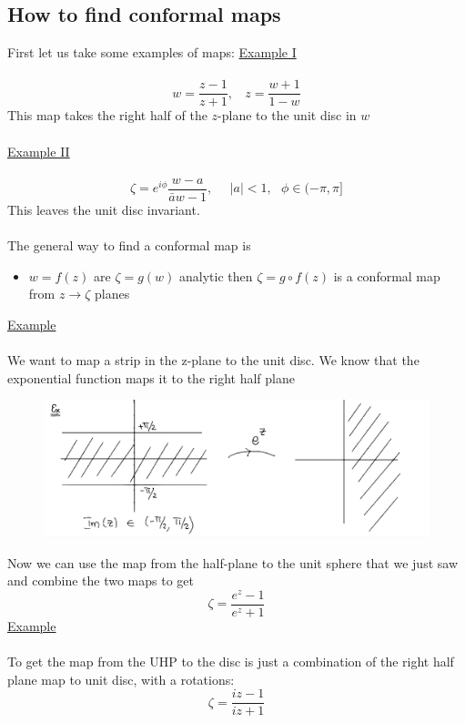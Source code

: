 \documentclass[a4paper,12pt]{article}
\begin{document}
\subsection{How to find conformal maps}
First let us take some examples of maps:
\underline{Example I}\\\\
\begin{equation}
w=\frac{z-1}{z+1},~~~~z=\frac{w+1}{1-w}
\end{equation}
This map takes the right half of the $z$-plane to the unit disc in $w$\\\\
\underline{Example II}\\\\
\begin{equation}
\zeta= e^{i\phi}\frac{w-a}{\bar a w-1},~~~~~~|a|<1,~~~\phi\in (-\pi,\pi]
\end{equation}
This leaves the unit disc invariant.\\\\
The general way to find a conformal map is
\begin{itemize}
\item $w=f(z)$ are $\zeta=g(w)$ analytic then $\zeta= g\circ f(z)$ is a conformal map from $z\to \zeta$ planes
\end{itemize}
\underline{Example}\\\\
We want to map a strip in the z-plane to the unit disc. We know that the exponential function maps it to the right half plane
\begin{figure}[H]
	\centering
	\includegraphics[width=0.7\linewidth]{7}
	\caption{}
	\label{fig:4}
\end{figure}
Now we can use the map from the half-plane to the unit sphere that we just saw and combine the two maps to get
\begin{equation}
\zeta = \frac{e^z-1}{e^z+1}
\end{equation}
\underline{Example}\\\\
To get the map from the UHP to the disc is just a combination of the right half plane map to unit disc, with a rotations:
\begin{equation}
\zeta=\frac{iz-1}{iz+1}
\end{equation}
\end{document}
